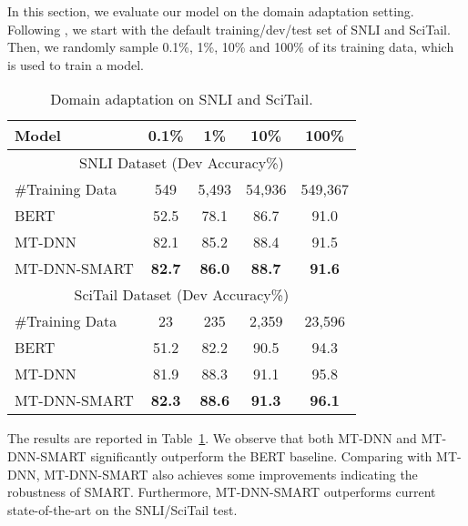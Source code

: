 \documentclass[11pt]{article} \usepackage{url}
\newcommand\model{SMART}
\begin{document}
In this section, we evaluate our model on the domain adaptation setting. Following \citet{liu2019mt-dnn}, we start with the default training/dev/test set of SNLI and SciTail. Then, we randomly sample 0.1\%, 1\%, 10\% and 100\% of its training data, which is used to train a model. 

\begin{table}[tb!]
\begin{center}
		\begin{tabular}{@{\hskip1pt}l@{\hskip1pt} |@{\hskip1pt} c @{\hskip1pt}|@{\hskip1pt} c @{\hskip1pt}|@{\hskip1pt} c @{\hskip1pt}|@{\hskip1pt} c@{\hskip1pt}}
			\hline \bf Model & 0.1\% & 1\% &10\% & 100\% \\ \hline
            \multicolumn{5}{c}{ SNLI Dataset (Dev Accuracy\%)} \\ \hline
            \#Training Data &549& 5,493& 54,936&549,367 \\ \hline
            BERT &52.5&78.1&86.7 & 91.0 \\ \hline
            MT-DNN &82.1 & 85.2 & 88.4 & 91.5 \\ \hline
            MT-DNN-{\model} &\textbf{82.7} & \textbf{86.0} & \textbf{88.7} &\textbf{91.6}  \\ \hline \hline

\multicolumn{5}{c}{ SciTail Dataset (Dev Accuracy\%)} \\ \hline
            \#Training Data &23& 235& 2,359& 23,596\\ \hline
            BERT &51.2&82.2&90.5 & 94.3 \\ \hline
            MT-DNN &81.9 & 88.3 & 91.1 & 95.8 \\ \hline			
            MT-DNN-{\model} &\textbf{82.3} &\textbf{88.6}  &\textbf{91.3} &\textbf{96.1}  \\ \hline
		\end{tabular}
	\end{center}
\caption{Domain adaptation on SNLI and SciTail. 
	}
	\label{tab:domain}
\end{table}









The results are reported in Table~\ref{tab:domain}. We observe that both MT-DNN and MT-DNN-{\model} significantly outperform the BERT baseline. Comparing with MT-DNN, MT-DNN-{\model} also achieves some improvements indicating the robustness of {\model}. Furthermore, MT-DNN-{\model} outperforms current state-of-the-art on the SNLI/SciTail test. 
\end{document}
